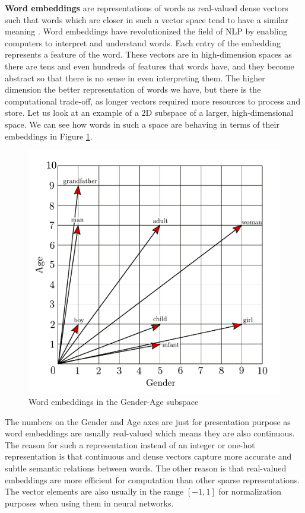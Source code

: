 \documentclass[12pt]{article}
\numberwithin{equation}{section}
\begin{document}
\begin{spacing}{1.5}
	\textbf{Word embeddings} are representations of words as real-valued dense vectors such that words which are closer in such a vector space tend to have a similar meaning \cite{word-embedding-survey}. Word embeddings have revolutionized the field of NLP by enabling computers to interpret and understand words. Each entry of the embedding represents a feature of the word. These vectors are in high-dimension spaces as there are tens and even hundreds of features that words have, and they become abstract so that there is no sense in even interpreting them. The higher dimension the better representation of words we have, but there is the computational trade-off, as longer vectors required more resources to process and store. Let us look at an example of a $2$D subspace of a larger, high-dimensional space. We can see how words in such a space are behaving in terms of their embeddings in Figure \ref{subspace_label}.
	\begin{figure}[H]
		\centering
		\hspace*{-1.0cm}
		\includegraphics[scale=0.75]{subspace}		
		\caption{Word embeddings in the Gender-Age subspace}
		\label{subspace_label}
	\end{figure}
	
	The numbers on the Gender and Age axes are just for presentation purpose as word embeddings are usually real-valued which means they are also continuous. The reason for such a representation instead of an integer or one-hot representation is that continuous and dense vectors capture more accurate and subtle semantic relations between words. The other reason is that real-valued embeddings are more efficient for computation than other sparse representations. The vector elements are also usually in the range $[-1, 1]$ for normalization purposes when using them in neural networks. 
	

\end{spacing}
\end{document}
